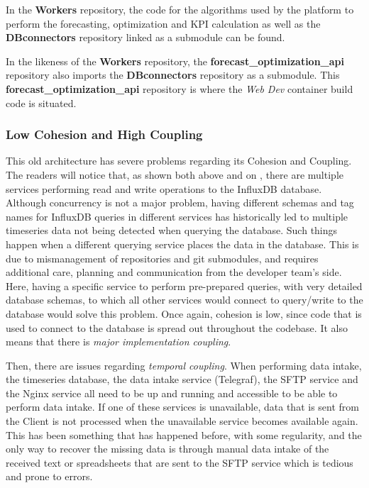 In the \textbf{Workers} repository, the code for the algorithms used by the platform to perform the forecasting, optimization and KPI calculation as well as the \textbf{DBconnectors} repository linked as a submodule can be found.

In the likeness of the \textbf{Workers} repository, the \textbf{forecast\_optimization\_api} repository also imports the \textbf{DBconnectors} repository as a submodule. This \textbf{forecast\_optimization\_api} repository is where the \textit{Web Dev} container build code is situated. 

\subsubsection{Low Cohesion and High Coupling}\label{methodology:sss:low-cohesion-and-high-coupling}

This old architecture has severe problems regarding its Cohesion and Coupling.
The readers will notice that, as shown both above and on , there are multiple services performing read and write operations to the InfluxDB database. Although concurrency is not a major problem, having different schemas and tag names for InfluxDB queries in different services has historically led to multiple timeseries data not being detected when querying the database. Such things happen when a different querying service places the data in the database. This is due to mismanagement of repositories and git submodules, and requires additional care, planning and communication from the developer team's side. Here, having a specific service to perform pre-prepared queries, with very detailed database schemas, to which all other services would connect to query/write to the database would solve this problem. Once again, cohesion is low, since code that is used to connect to the database is spread out throughout the codebase. It also means that there is \textit{major implementation coupling}.

Then, there are issues regarding \textit{temporal coupling}. When performing data intake, the timeseries database, the data intake service (Telegraf), the SFTP service and the Nginx service all need to be up and running and accessible to be able to perform data intake. If one of these services is unavailable, data that is sent from the Client is not processed when the unavailable service becomes available again. This has been something that has happened before, with some regularity, and the only way to recover the missing data is through manual data intake of the received text or spreadsheets that are sent to the SFTP service which is tedious and prone to errors.

